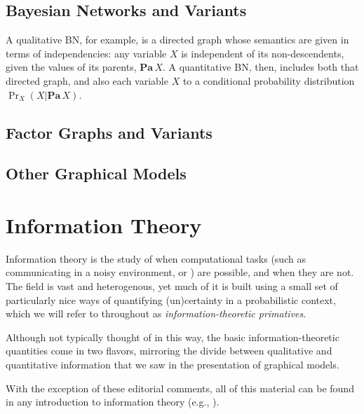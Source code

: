 \subsection{Bayesian Networks and Variants}

A qualitative BN, for example, is a directed graph whose semantics are given in terms of independencies: any variable $X$ is independent of its non-descendents, given the values of its parents, $\mathbf{Pa}\, X$.  
A quantitative BN, then, includes both that directed graph, and also each variable $X$ to a conditional probability distribution $\Pr_X(X|\mathbf{Pa}\, X)$.

\subsection{Factor Graphs and Variants}


\subsection{Other Graphical Models}



\section{Information Theory}

Information theory is the study of when computational tasks
    (such as communicating in a noisy environment, 
        or )
    are possible, and when they are not. 
%
The field is vast and heterogenous, 
    yet much of it is built using a small set of 
    particularly nice ways of quantifying (un)certainty in a probabilistic
    context, which we will refer to throughout as \emph{information-theoretic primatives}.

Although not typically thought of in this way, 
    the basic information-theoretic quantities come in two flavors, mirroring the divide between qualitative and quantitative information that we saw in the presentation of graphical models. 

With the exception of these editorial comments,
all of this material can be found in any introduction to information
theory (e.g., \cite[Chapter 1]{mackay2003information}).  


